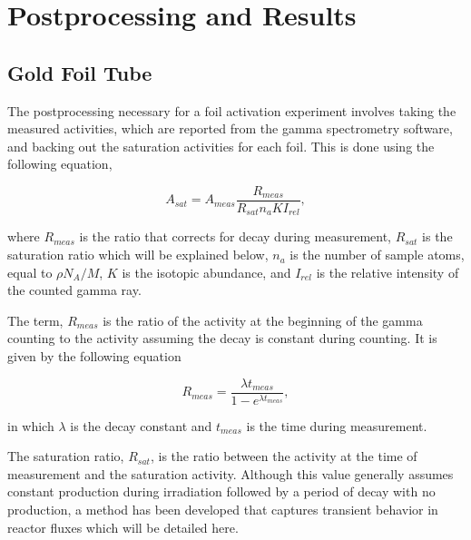 \section{Postprocessing and Results}


\subsection{Gold Foil Tube}


The postprocessing necessary for a foil activation experiment involves taking the measured activities, which are reported from the gamma spectrometry software, and backing out the saturation activities for each foil.
This is done using the following equation,

\begin{equation}
\label{eqn:a_sat}
A_{sat} = A_{meas} \frac{R_{meas}}{R_{sat} n_a K I_{rel}} ,
\end{equation}

where $R_{meas}$ is the ratio that corrects for decay during measurement, $R_{sat}$ is the saturation ratio which will be explained below, $n_a$ is the number of sample atoms, equal to $\rho N_A / M$, $K$ is the isotopic abundance, and $I_{rel}$ is the relative intensity of the counted gamma ray.

The term, $R_{meas}$ is the ratio of the activity at the beginning of the gamma counting to the activity assuming the decay is constant during counting.
It is given by the following equation

\begin{equation}
\label{eqn:r_meas}
R_{meas} = \frac{\lambda t_{meas}}{1 - e^{\lambda t_{meas}}},
\end{equation}

in which $\lambda$ is the decay constant and $t_{meas}$ is the time during measurement.

The saturation ratio, $R_{sat}$, is the ratio between the activity at the time of measurement and the saturation activity.
Although this value generally assumes constant production during irradiation followed by a period of decay with no production, a method has been developed that captures transient behavior in reactor fluxes which will be detailed here.

